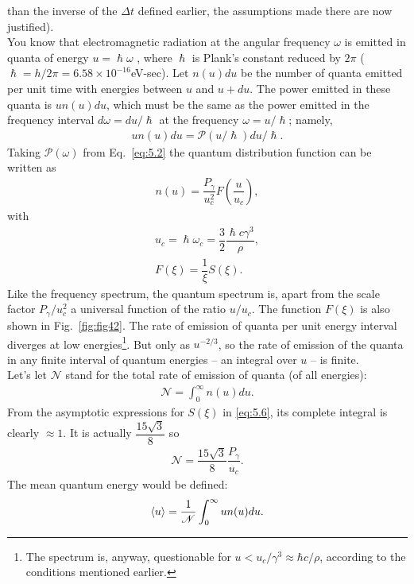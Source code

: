 \documentclass[../sands-adaptation.tex]{subfiles}
\begin{document}
 than the inverse of the $\Delta t$ defined earlier, the assumptions made there are now justified).\\
You know that electromagnetic radiation at the angular frequency $\omega$ is emitted in quanta of energy $u = \hslash \omega$ , where $\hslash$ is Plank's constant reduced by $2\pi$ ($\hslash = h/2\pi = 6.58 \times 10^{-16}$eV-sec). Let $n(u)du$ be the number of quanta emitted per unit time with energies between $u$ and $u + du$. The power emitted in these quanta is $un(u)du$,
which must be the same as the power emitted in the frequency interval $d\omega = du/\hslash$
at the frequency $\omega = u/\hslash$; namely,
\begin{align}
	u n(u) du = \mathscr{P}(u/\hslash)du/\hslash.
\end{align}
Taking $\mathscr{P}(\omega)$ from Eq.~\eqref{eq:5.2} the quantum distribution function can be written as
\begin{align}
	n(u) = \dfrac{P_\gamma}{u_c^2} F\left( \dfrac{u}{u_c} \right),
\end{align}
with
\begin{align} \label{eq:5.9}
	u_c = \hslash \omega_c = \dfrac{3}{2} \dfrac{\hslash c \gamma^3}{\rho},\\
    F(\xi) = \dfrac{1}{\xi}S(\xi).
\end{align}
Like the frequency spectrum, the quantum spectrum is, apart from the scale factor $P_\gamma/u_c^2$ a universal function of the ratio $u/u_c$.
The function $F(\xi)$ is also shown in Fig.~\ref{fig:fig42}. The rate of emission of quanta per unit energy interval diverges at low energies\footnote{The spectrum is, anyway, questionable for $u < u_c/\gamma^3 \approx \hbar c/\rho$, according to the conditions mentioned earlier.}. But only as $u^{-2/3}$, so the rate of emission of the quanta in any finite interval of quantum energies -- an integral
 over $u$ -- is finite.\\
Let's let $\mathscr{N}$ stand for the total rate of emission of quanta (of all energies):
\begin{align}
	\mathscr{N} = \int_0^\infty n(u) du.
\end{align}
From the asymptotic expressions for $S(\xi)$ in \eqref{eq:5.6}, its complete integral
 is clearly $\approx 1$. It is actually $\dfrac{15\sqrt{3}}{8}$ so
\begin{align} \label{eq:5.12}
	\mathscr{N} = \dfrac{15\sqrt{3}}{8} \dfrac{P_\gamma}{u_c}.
\end{align}
The mean quantum energy would be defined:
\begin{align}
	\left< u \right> = \dfrac{1}{\mathscr{N}} \int_0^\infty u n(u) du.
\end{align}
\end{document}
